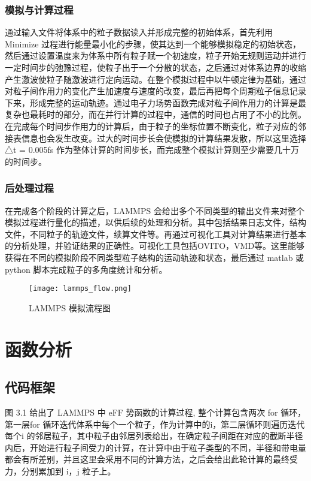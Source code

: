 \subsubsection{模拟与计算过程}
通过输入文件将体系中的粒子数据读入并形成完整的初始体系，首先利用Minimize 过程进行能量最小化的步骤，使其达到一个能够模拟稳定的初始状态，然后通过设置温度来为体系中所有粒子赋一个初速度，粒子开始无规则运动并进行一定时间步的弛豫过程，使粒子出于一个分散的状态，之后通过对体系边界的收缩产生激波使粒子随激波进行定向运动。在整个模拟过程中以牛顿定律为基础，通过对粒子间作用力的变化产生加速度与速度的改变，最后再把每个周期粒子信息记录下来，形成完整的运动轨迹。通过电子力场势函数完成对粒子间作用力的计算是最复杂也最耗时的部分，而在并行计算的过程中，通信的时间也占用了不小的比例。在完成每个时间步作用力的计算后，由于粒子的坐标位置不断变化，粒子对应的邻接表信息也会发生改变。过大的时间步长会使模拟的计算结果发散，所以这里选择△t = 0.005fs 作为整体计算的时间步长，而完成整个模拟计算则至少需要几十万的时间步。

\subsubsection{后处理过程}
在完成各个阶段的计算之后，LAMMPS 会给出多个不同类型的输出文件来对整个模拟过程进行量化的描述，以供后续的处理和分析。其中包括结果日志文件，结构文件，不同粒子的轨迹文件，续算文件等。再通过可视化工具对计算结果进行基本的分析处理，并验证结果的正确性。可视化工具包括OVITO，VMD等。这里能够获得在不同的模拟阶段不同类型粒子结构的运动轨迹和状态，最后通过 matlab 或 python 脚本完成粒子的多角度统计和分析。

 \begin{figure}[h]
  \centering
  \texttt{[image: lammps\_flow.png]}
  \caption{LAMMPS 模拟流程图}
\end{figure}

\section{函数分析}

\subsection{代码框架}
图 3.1 给出了 LAMMPS 中 eFF 势函数的计算过程, 整个计算包含两次 for 循环，第一层for 循环迭代体系中每个一个粒子，作为计算中的i，第二层循环则遍历迭代每个i 的邻居粒子，其中粒子由邻居列表给出，在确定粒子间距在对应的截断半径内后，开始进行粒子间受力的计算，在计算中由于粒子类型的不同，半径和带电量都会有所差别，并且这里会采用不同的计算方法，之后会给出此轮计算的最终受力，分别累加到 i，j 粒子上。

